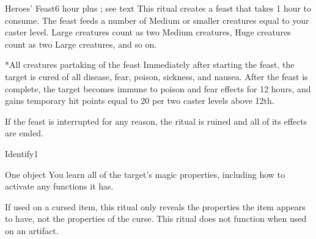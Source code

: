 \begin{spellsection}{Heroes' Feast}{6}
 hour plus \durext; see text
\spellline
\spelleffect This ritual creates a feast that takes 1 hour to consume. The feast feeds a number of Medium or smaller creatures equal to your caster level. Large creatures count as two Medium creatures, Huge creatures count as two Large creatures, and so on.
\begin{spelltargets}*{All creatures partaking of the feast}
    Immediately after starting the feast, the target is cured of all disease, fear, poison, sickness, and nausea. After the feast is complete, the target becomes immune to poison and fear effects for 12 hours, and gains temporary hit points equal to 20  per two caster levels above 12th.
\end{spelltargets}

\spellnotes If the feast is interrupted for any reason, the ritual is ruined and all of its effects are ended.
\end{spellsection}

\begin{spellsection}{Identify}{1}
\begin{spelltarget}{One object}
    \spelleffect You learn all of the target's magic properties, including how to activate any functions it has.
\end{spelltarget}
\spellnotes If used on a cursed item, this ritual only reveals the properties the item appears to have, not the properties of the curse. This ritual does not function when used on an artifact.
\end{spellsection}

